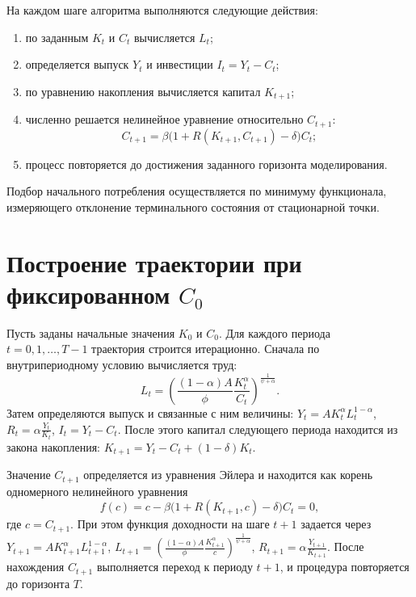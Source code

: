\documentclass[12pt,a4paper]{report}   %
\begin{document}
        На каждом шаге алгоритма выполняются следующие действия:
        \begin{enumerate}[label=\arabic*)]
            \item по заданным $K_t$ и $C_t$ вычисляется $L_t$;
            \item определяется выпуск $Y_t$ и инвестиции $I_t=Y_t-C_t$;
            \item по уравнению накопления вычисляется капитал $K_{t+1}$;
            \item численно решается нелинейное уравнение относительно $C_{t+1}$:
            \begin{equation}
            C_{t+1}=\beta\bigl(1+R(K_{t+1},C_{t+1})-\delta\bigr)C_t;
            \end{equation}
            \item процесс повторяется до достижения заданного горизонта моделирования.
        \end{enumerate}

        Подбор начального потребления осуществляется по минимуму функционала, измеряющего отклонение терминального состояния от стационарной точки.
            
        \section{Построение траектории при фиксированном \texorpdfstring{$C_0$}{C0}}

            Пусть заданы начальные значения $K_0$ и $C_0$. Для каждого периода $t=0,1,\dots,T-1$ траектория строится итерационно. Сначала по внутрипериодному условию вычисляется труд:
            \[
            L_t=\left(\frac{(1-\alpha)A}{\phi}\frac{K_t^\alpha}{C_t}\right)^{\frac{1}{\psi+\alpha}}.
            \]
            Затем определяются выпуск и связанные с ним величины:
            \(Y_t=A K_t^\alpha L_t^{1-\alpha}\),
            \(R_t=\alpha\frac{Y_t}{K_t}\),
            \(I_t=Y_t-C_t\).
            После этого капитал следующего периода находится из закона накопления:
            \(K_{t+1}=Y_t-C_t+(1-\delta)K_t\).

            Значение $C_{t+1}$ определяется из уравнения Эйлера и находится как корень одномерного нелинейного уравнения
            \[
            f(c)=c-\beta\bigl(1+R(K_{t+1},c)-\delta\bigr)C_t=0,
            \]
            где \(c=C_{t+1}\).
            При этом функция доходности на шаге \(t+1\) задается через
            \(Y_{t+1}=A K_{t+1}^\alpha L_{t+1}^{1-\alpha}\),
            \(L_{t+1}=\left(\frac{(1-\alpha)A}{\phi}\frac{K_{t+1}^\alpha}{c}\right)^{\frac{1}{\psi+\alpha}}\),
            \(R_{t+1}=\alpha\frac{Y_{t+1}}{K_{t+1}}\).
            После нахождения \(C_{t+1}\) выполняется переход к периоду \(t+1\), и процедура повторяется до горизонта \(T\).
\end{document}
